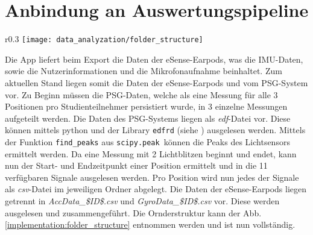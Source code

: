 \section{Anbindung an Auswertungspipeline}
\label{ch:Implementierung:way_to_pipeline}
\begin{wrapfigure}{r}{0.3\textwidth}
  \centering
  \texttt{[image: data\_analyzation/folder\_structure]}
  \caption{Ornderstruktur des Datensatzes}
  \label{implementation:folder_structure}
\end{wrapfigure}
Die App liefert beim Export die Daten der eSense-Earpods, was die IMU-Daten, sowie die Nutzerinformationen und die Mikrofonaufnahme beinhaltet.
Zum aktuellen Stand liegen somit die Daten der eSense-Earpods und vom PSG-System vor. 
Zu Beginn müssen die PSG-Daten, welche als eine Messung für alle 3 Positionen pro Studienteilnehmer persistiert wurde, in 3 einzelne Messungen aufgeteilt werden.
Die Daten des PSG-Systems liegen als \textit{edf}-Datei vor. 
Diese können mittels python und der Library \texttt{edfrd} (siehe ) ausgelesen werden.
Mittels der Funktion \texttt{find\_peaks} aus \texttt{scipy.peak}\ können die Peaks des Lichtsensors ermittelt werden.
Da eine Messung mit 2 Lichtblitzen beginnt und endet, kann nun der Start- und Endzeitpunkt einer Position ermittelt und in die 11 verfügbaren Signale ausgelesen werden.
Pro Position wird nun jedes der Signale als \textit{csv}-Datei im jeweiligen Ordner abgelegt.
Die Daten der eSense-Earpods liegen getrennt in \textit{AccData\_\$ID\$.csv} und \textit{GyroData\_\$ID\$.csv} vor. 
Diese werden ausgelesen und zusammengeführt.
Die Ornderstruktur kann der Abb. \ref{implementation:folder_structure} entnommen werden und ist nun vollständig.

